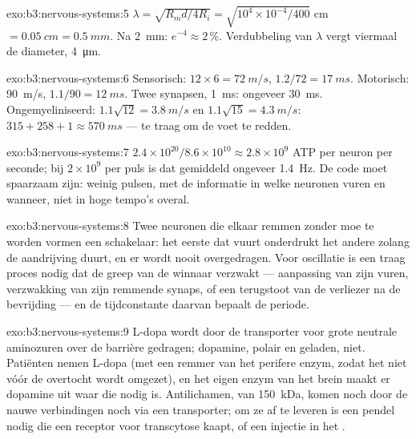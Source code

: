 \begin{solution}{exo:b3:nervous-systems:5}
$\lambda = \sqrt{R_{m}d/4R_{i}} = \sqrt{10^{4}\times 10^{-4}/400}$ cm
$= \qty{0.05}{cm} = \qty{0.5}{mm}$. Na \qty{2}{mm}: $e^{-4} \approx
2\,\%$. Verdubbeling van $\lambda$ vergt viermaal de diameter,
\qty{4}{\micro m}.
\end{solution}

\begin{solution}{exo:b3:nervous-systems:6}
Sensorisch: $12\times 6 = \qty{72}{m/s}$, $1.2/72 = \qty{17}{ms}$.
Motorisch: \qty{90}{m/s}, $1.1/90 = \qty{12}{ms}$. Twee synapsen,
\qty{1}{ms}: ongeveer \qty{30}{ms}. Ongemyeliniseerd:
$1.1\sqrt{12} = \qty{3.8}{m/s}$ en
$1.1\sqrt{15} = \qty{4.3}{m/s}$: $315 + 258 + 1 \approx \qty{570}{ms}$
--- te traag om de voet te redden.
\end{solution}

\begin{solution}{exo:b3:nervous-systems:7}
$2.4\times 10^{20}/8.6\times 10^{10} \approx 2.8\times 10^{9}$ ATP per
neuron per seconde; bij $2\times 10^{9}$ per puls is dat gemiddeld
ongeveer \qty{1.4}{Hz}. De code moet spaarzaam zijn: weinig pulsen, met
de informatie in welke neuronen vuren en wanneer, niet in hoge tempo's
overal.
\end{solution}

\begin{solution}{exo:b3:nervous-systems:8}
Twee neuronen die elkaar remmen zonder moe te worden vormen een
schakelaar: het eerste dat vuurt onderdrukt het andere zolang de
aandrijving duurt, en er wordt nooit overgedragen. Voor oscillatie is
een traag proces nodig dat de greep van de winnaar verzwakt ---
aanpassing van zijn vuren, verzwakking van zijn remmende synaps, of een
terugstoot van de verliezer na de bevrijding --- en de tijdconstante
daarvan bepaalt de periode.
\end{solution}

\begin{solution}{exo:b3:nervous-systems:9}
L-dopa wordt door de transporter voor grote neutrale aminozuren over de
barrière gedragen; dopamine, polair en geladen, niet. Patiënten nemen
L-dopa (met een remmer van het perifere enzym, zodat het niet vóór de
overtocht wordt omgezet), en het eigen enzym van het brein maakt er
dopamine uit waar die nodig is. Antilichamen, van \qty{150}{kDa}, komen
noch door de nauwe verbindingen noch via een transporter; om ze af te
leveren is een pendel nodig die een receptor voor transcytose kaapt, of
een injectie in het .
\end{solution}

